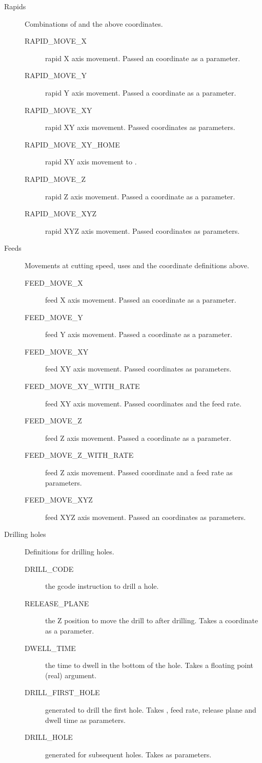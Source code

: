 \documentclass[11pt]{book}
\begin{document}
\begin{description}
\item[Rapids] Combinations of  and the above coordinates.
\begin{description}
	\item[RAPID\_{}MOVE\_{}X] rapid X axis movement. Passed an  coordinate as a parameter.
	\item[RAPID\_{}MOVE\_{}Y] rapid Y axis movement. Passed a  coordinate as a parameter.
	\item[RAPID\_{}MOVE\_{}XY] rapid XY axis movement. Passed  coordinates as parameters.
	\item[RAPID\_{}MOVE\_{}XY\_{}HOME] rapid XY axis movement to .
	\item[RAPID\_{}MOVE\_{}Z] rapid Z axis movement. Passed a  coordinate as a parameter.
	\item[RAPID\_{}MOVE\_{}XYZ] rapid XYZ axis movement. Passed  coordinates as parameters.
\end{description}

\item[Feeds] Movements at cutting speed, uses  and the coordinate definitions above.
\begin{description}
	\item[FEED\_{}MOVE\_{}X] feed X axis movement. Passed an  coordinate as a parameter.
	\item[FEED\_{}MOVE\_{}Y] feed Y axis movement. Passed a  coordinate as a parameter.
	\item[FEED\_{}MOVE\_{}XY] feed XY axis movement. Passed  coordinates as parameters.
	\item[FEED\_{}MOVE\_{}XY\_{}WITH\_{}RATE] feed XY axis movement. Passed  coordinates and the feed rate.
	\item[FEED\_{}MOVE\_{}Z] feed Z axis movement. Passed a  coordinate as a parameter.
	\item[FEED\_{}MOVE\_{}Z\_{}WITH\_{}RATE] feed Z axis movement. Passed  coordinate and a feed rate as parameters.
	\item[FEED\_{}MOVE\_{}XYZ] feed XYZ axis movement. Passed an  coordinates as parameters.
\end{description}

\item[Drilling holes] Definitions for drilling holes.
\begin{description}
	\item[DRILL\_{}CODE] the gcode instruction to drill a hole.
	\item[RELEASE\_{}PLANE] the Z position to move the drill to after drilling. Takes a  coordinate as a parameter.
	\item[DWELL\_{}TIME] the time to dwell in the bottom of the hole. Takes a floating point (real) argument.
	\item[DRILL\_{}FIRST\_{}HOLE] generated to drill the first hole. Takes , feed rate, release  plane and dwell time as parameters.
	\item[DRILL\_{}HOLE] generated for subsequent holes. Takes  as parameters.
\end{description}


\end{description}
\end{document}
